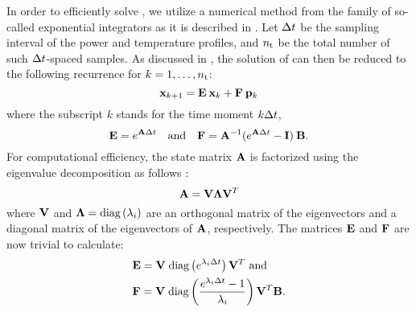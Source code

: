 In order to efficiently solve , we utilize a numerical method from the family of so-called exponential integrators \cite{hochbruck2010} as it is described in .
Let $\Delta t$ be the sampling interval of the power and temperature profiles, and ${n_\text{t}}$ be the total number of such $\Delta t$-spaced samples. As discussed in \cite{ukhov2012}, the solution of  can then be reduced to the following recurrence for $k = 1, \dots, {n_\text{t}}$:
\begin{equation} \elabel{recurrence}
  \vX_{k + 1} = \mE \: \vX_k + \mF \: \vP_k
\end{equation}
where the subscript $k$ stands for the time moment $k \Delta t$,
\[
  \mathbf{E} = e^{\mathbf{A} \Delta t} \hspace{1em} \text{and} \hspace{1em} \mathbf{F} = \mathbf{A}^{-1} (e^{\mathbf{A} \Delta t} - \mathbf{I}) \: \mathbf{B}.
\]
For computational efficiency, the state matrix $\mathbf{A}$ is factorized using the eigenvalue decomposition as follows \cite{press2007}:
\begin{equation} \elabel{eigenvalue-decomposition}
  \mA = \mV \mL \mV^T
\end{equation}
where $\mathbf{V}$ and $\mathbf{\Lambda} = \text{diag}\left( \lambda_i \right)$ are an orthogonal matrix of the eigenvectors and a diagonal matrix of the eigenvectors of $\mathbf{A}$, respectively.
The matrices $\mathbf{E}$ and $\mathbf{F}$ are now trivial to calculate:
\begin{align*}
  & \mathbf{E} = \mathbf{V} \; \text{diag}\left( e^{\lambda_i \Delta t} \right) \mathbf{V}^T \text{ and} \\
  & \mathbf{F} = \mathbf{V} \; \text{diag}\left(  \frac{e^{\lambda_i \Delta t} - 1}{\lambda_i}  \right) \mathbf{V}^T \mathbf{B}.
\end{align*}
